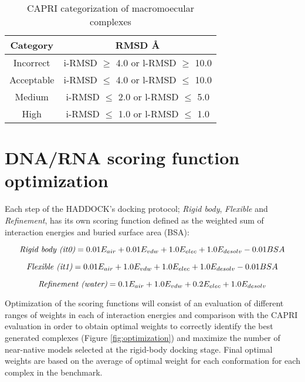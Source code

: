 \documentclass[
	12pt,				%
	openright,			%
	twoside,			%
	a4paper,			%
	english,			%
	french,				%
	spanish,			%
	brazil,				%
	]{abntex2}
\begin{document}
% 
\begin{table}[h]
	\centering
	\caption{CAPRI categorization of macromoecular complexes}
	\label{table:capri-table}
	\begin{tabular}{|c|c|}
		\hline
		\rowcolor[HTML]{C0C0C0} 
		Category   & RMSD \AA                          \\ \hline
		Incorrect  & i-RMSD $\geq$ 4.0 or l-RMSD $\geq$ 10.0 \\ \hline
		Acceptable & i-RMSD $\leq$ 4.0 or l-RMSD $\leq$ 10.0 \\ \hline
		Medium     & i-RMSD $\leq$ 2.0 or l-RMSD $\leq$ 5.0  \\ \hline
		High       & i-RMSD $\leq$ 1.0 or l-RMSD $\leq$ 1.0  \\ \hline
	\end{tabular}
\end{table}

\section{DNA/RNA scoring function optimization}

Each step of the HADDOCK’s docking protocol; \textit{Rigid body}, \textit{Flexible} and \textit{Refinement}, has its own scoring function defined as the weighted sum of interaction energies and buried surface area (BSA):

\begin{equation}
\emph{Rigid body (it0)} = 0.01 E_{air} + 0.01 E_{vdw} + 1.0 E_{elec} + 1.0 E_{desolv} - 0.01 BSA
\label{eq:05}
\end{equation}

\begin{equation}
\emph{Flexible (it1)} = 0.01 E_{air} + 1.0 E_{vdw} + 1.0 E_{elec} + 1.0 E_{desolv} - 0.01 BSA
\label{eq:06}
\end{equation}

\begin{equation}
\emph{Refinement (water)} = 0.1 E_{air} + 1.0 E_{vdw} + 0.2 E_{elec} + 1.0 E_{desolv}
\label{eq:07}
\end{equation}

Optimization of the scoring functions will consist of an evaluation of different ranges of weights in each of interaction energies and comparison with the CAPRI evaluation in order to obtain optimal weights to correctly identify the best generated complexes (Figure \ref{fig:optimization}) and maximize the number of near-native models selected at the rigid-body docking stage. Final optimal weights are based on the average of optimal weight for each conformation for each complex in the benchmark.
\end{document}
